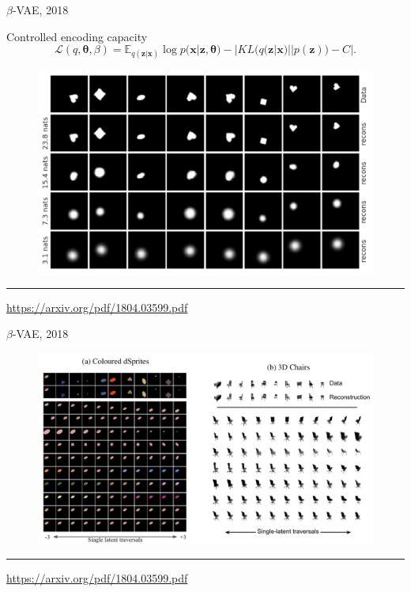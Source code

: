 \documentclass{beamer}
\newcommand{\bx}{\mathbf{x}}
\newcommand{\bz}{\mathbf{z}}
\newcommand{\btheta}{\boldsymbol{\theta}}
\begin{document}
\begin{frame}{$\beta$-VAE, 2018}
\begin{block}{Controlled encoding capacity}
\vspace{-0.5cm}
\[
    \mathcal{L}(q, \btheta, \beta) = \mathbb{E}_{q(\bz | \bx)} \log p(\bx | \bz, \btheta) - | KL (q(\bz | \bx) || p(\bz)) - C|.
\]
\end{block}
\begin{figure}
    \centering
    \includegraphics[width=0.8\linewidth]{figs/betaVAE_8.png}
\end{figure}
\vfill
\hrule\medskip
{\scriptsize \href{https://arxiv.org/pdf/1804.03599.pdf}{https://arxiv.org/pdf/1804.03599.pdf}}
\end{frame}
\begin{frame}{$\beta$-VAE, 2018}
\begin{figure}
    \centering
    \includegraphics[width=\linewidth]{figs/betaVAE_9.png}
\end{figure}
\vfill
\hrule\medskip
{\scriptsize \href{https://arxiv.org/pdf/1804.03599.pdf}{https://arxiv.org/pdf/1804.03599.pdf}}
\end{frame}
\end{document}
